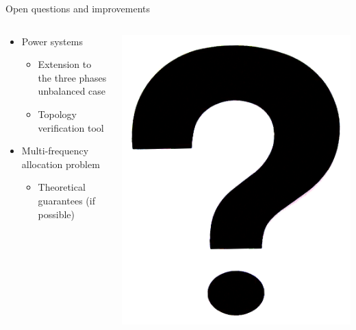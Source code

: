 \documentclass[../main.tex]{subfiles}
\begin{document}
%
%





%
%



\begin{frame}[fragile]{Open questions and improvements}

\begin{columns}[c]

\begin{column}{0.8\linewidth}
\begin{itemize}
\item Power systems
\begin{itemize}
\item Extension to the three phases unbalanced case
\item Topology verification tool
\end{itemize}
\item Multi-frequency allocation problem
\begin{itemize}
\item Theoretical guarantees (if possible)
\end{itemize}
\end{itemize}
\end{column}

\begin{column}{0.2\linewidth}
\centering
\includegraphics[scale=0.1]{pics/question_mark.png}
\end{column}
\end{columns}


\end{frame}
\end{document}
